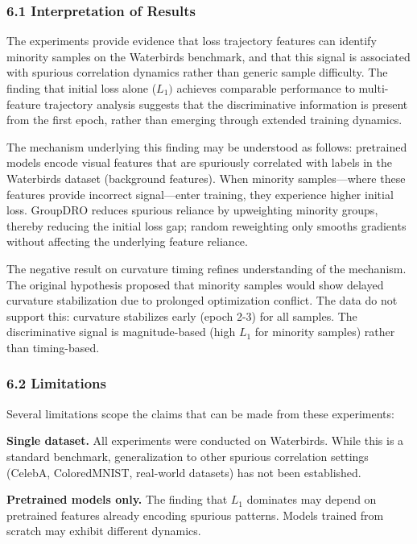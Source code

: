 
\subsubsection{6.1 Interpretation of Results}

The experiments provide evidence that loss trajectory features can identify minority samples on the Waterbirds benchmark, and that this signal is associated with spurious correlation dynamics rather than generic sample difficulty. The finding that initial loss alone ($L_{1})$ achieves comparable performance to multi-feature trajectory analysis suggests that the discriminative information is present from the first epoch, rather than emerging through extended training dynamics.

The mechanism underlying this finding may be understood as follows: pretrained models encode visual features that are spuriously correlated with labels in the Waterbirds dataset (background features). When minority samples---where these features provide incorrect signal---enter training, they experience higher initial loss. GroupDRO reduces spurious reliance by upweighting minority groups, thereby reducing the initial loss gap; random reweighting only smooths gradients without affecting the underlying feature reliance.

The negative result on curvature timing refines understanding of the mechanism. The original hypothesis proposed that minority samples would show delayed curvature stabilization due to prolonged optimization conflict. The data do not support this: curvature stabilizes early (epoch 2-3) for all samples. The discriminative signal is magnitude-based (high $L_1$ for minority samples) rather than timing-based.

\subsubsection{6.2 Limitations}

Several limitations scope the claims that can be made from these experiments:

\textbf{Single dataset.} All experiments were conducted on Waterbirds. While this is a standard benchmark, generalization to other spurious correlation settings (CelebA, ColoredMNIST, real-world datasets) has not been established.

\textbf{Pretrained models only.} The finding that $L_1$ dominates may depend on pretrained features already encoding spurious patterns. Models trained from scratch may exhibit different dynamics.

